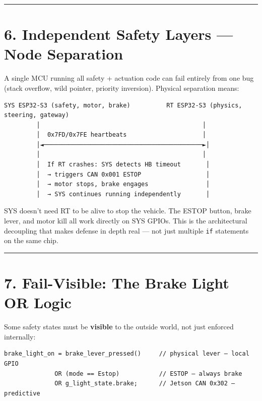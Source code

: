 \documentclass[12pt,a4paper,oneside]{report}
\begin{document}
\begin{center}\rule{0.5\linewidth}{0.5pt}\end{center}

\section{6. Independent Safety Layers --- Node
Separation}\label{independent-safety-layers-node-separation}

A single MCU running all safety + actuation code can fail entirely from one bug
(stack overflow, wild pointer, priority inversion). Physical separation means:

\begin{verbatim}
SYS ESP32-S3 (safety, motor, brake)          RT ESP32-S3 (physics, steering, gateway)
         │                                             │
         │  0x7FD/0x7FE heartbeats                     │
         │◄────────────────────────────────────────────►│
         │                                             │
         │  If RT crashes: SYS detects HB timeout       │
         │  → triggers CAN 0x001 ESTOP                  │
         │  → motor stops, brake engages                │
         │  → SYS continues running independently       │
\end{verbatim}

SYS doesn't need RT to be alive to stop the vehicle. The ESTOP button, brake
lever, and motor kill all work directly on SYS GPIOs. This is the architectural
decoupling that makes defense in depth real --- not just multiple \texttt{if}
statements on the same chip.

\begin{center}\rule{0.5\linewidth}{0.5pt}\end{center}

\section{7. Fail-Visible: The Brake Light OR
Logic}\label{fail-visible-the-brake-light-or-logic}

Some safety states must be \textbf{visible} to the outside world, not just
enforced internally:

\begin{verbatim}
brake_light_on = brake_lever_pressed()     // physical lever — local GPIO
              OR (mode == Estop)           // ESTOP — always brake
              OR g_light_state.brake;      // Jetson CAN 0x302 — predictive
\end{verbatim}
\end{document}

